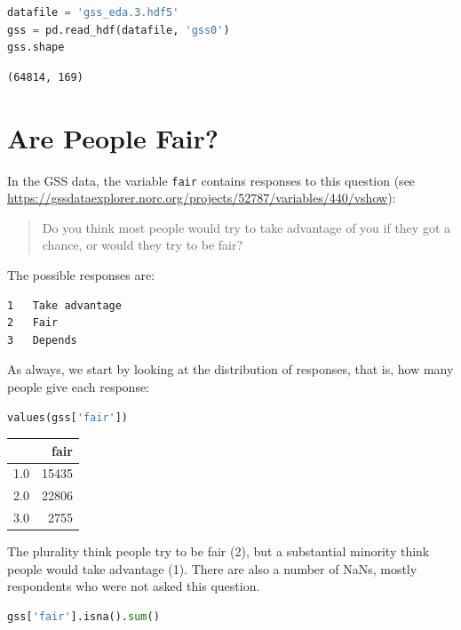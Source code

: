 \begin{lstlisting}[language=Python]
datafile = 'gss_eda.3.hdf5'
gss = pd.read_hdf(datafile, 'gss0')
gss.shape
\end{lstlisting}

\begin{lstlisting}[]
(64814, 169)
\end{lstlisting}

\hypertarget{are-people-fair}{%
\section{Are People Fair?}\label{are-people-fair}}

In the GSS data, the variable \passthrough{\lstinline!fair!} contains
responses to this question (see
\url{https://gssdataexplorer.norc.org/projects/52787/variables/440/vshow}):

\begin{quote}
Do you think most people would try to take advantage of you if they got
a chance, or would they try to be fair?
\end{quote}

The possible responses are:

\begin{lstlisting}[]
1   Take advantage
2   Fair
3   Depends
\end{lstlisting}

As always, we start by looking at the distribution of responses, that
is, how many people give each response:

\begin{lstlisting}[language=Python]
values(gss['fair'])
\end{lstlisting}

\begin{tabular}{lr}
\toprule
{} &   fair \\
\midrule
1.0 &  15435 \\
2.0 &  22806 \\
3.0 &   2755 \\
\bottomrule
\end{tabular}

The plurality think people try to be fair (2), but a substantial
minority think people would take advantage (1). There are also a number
of NaNs, mostly respondents who were not asked this question.

\begin{lstlisting}[language=Python]
gss['fair'].isna().sum()
\end{lstlisting}


